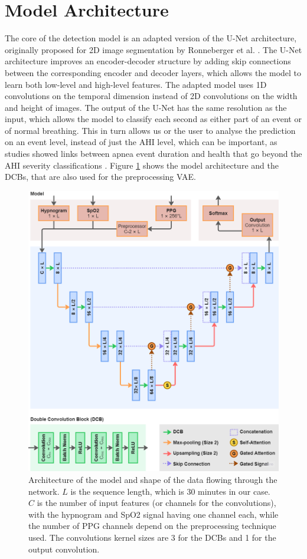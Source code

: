 \section{Model Architecture}

The core of the detection model is an adapted version of the U-Net architecture, originally proposed for 2D image segmentation by Ronneberger et al. \cite{ronneberger2015u}. The U-Net architecture improves an encoder-decoder structure by adding skip connections between the corresponding encoder and decoder layers, which allows the model to learn both low-level and high-level features. The adapted model uses 1D convolutions on the temporal dimension instead of 2D convolutions on the width and height of images. The output of the U-Net has the same resolution as the input, which allows the model to classify each second as either part of an event or of normal breathing. This in turn allows us or the user to analyse the prediction on an event level, instead of just the AHI level, which can be important, as studies showed links between apnea event duration and health that go beyond the AHI severity classifications \cite{butler2019apnea}. Figure \ref{fig:model} shows the model architecture and the DCBs, that are also used for the preprocessing VAE.

\begin{figure}
    \centering
    \includegraphics[width=\textwidth]{images/Model}
    \caption{Architecture of the model and shape of the data flowing through the network. $L$ is the sequence length, which is 30 minutes in our case. $C$ is the number of input features (or channels for the convolutions), with the hypnogram and SpO2 signal having one channel each, while the number of PPG channels depend on the preprocessing technique used. The convolutions kernel sizes are 3 for the DCBs and 1 for the output convolution.}
    \label{fig:model}
\end{figure}

